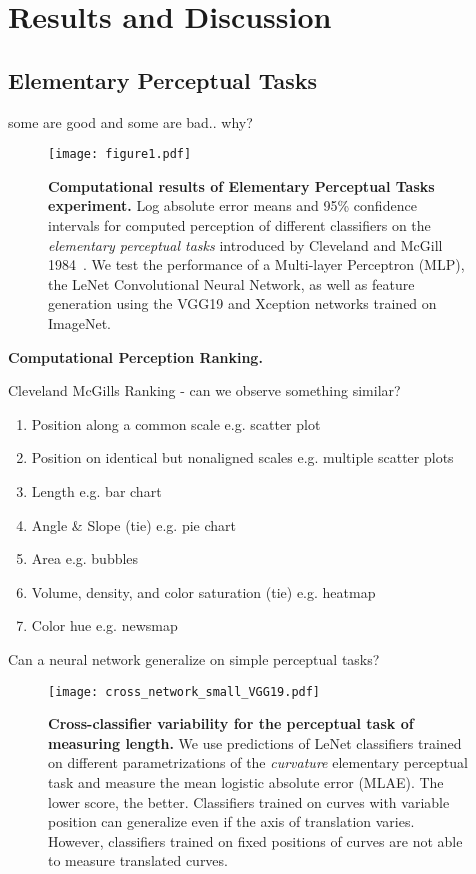 \section{Results and Discussion}

\subsection{Elementary Perceptual Tasks}

some are good and some are bad.. why?

\begin{figure*}[h]
	\centering
	  \texttt{[image: figure1.pdf]}
  \caption{\textbf{Computational results of Elementary Perceptual Tasks experiment.} Log absolute error means and 95\% confidence intervals for computed perception of different classifiers on the \emph{elementary perceptual tasks} introduced by Cleveland and McGill 1984~\cite{cleveland_mcgill}. We test the performance of a Multi-layer Perceptron (MLP), the LeNet Convolutional Neural Network, as well as feature generation using the VGG19 and Xception networks trained on ImageNet.}
	\label{fig:figure1_results}
\end{figure*}

\textbf{Computational Perception Ranking.}

Cleveland McGills Ranking - can we observe something similar?

\begin{enumerate}
	\item Position along a common scale e.g. scatter plot
	\item Position on identical but nonaligned scales e.g. multiple scatter plots
	\item Length e.g. bar chart
	\item Angle \& Slope (tie) e.g. pie chart
	\item Area e.g. bubbles
	\item Volume, density, and color saturation (tie) e.g. heatmap
	\item Color hue e.g. newsmap
\end{enumerate}


Can a neural network generalize on simple perceptual tasks?

\begin{figure}[t]
	  \texttt{[image: cross\_network\_small\_VGG19.pdf]}
  \caption{\textbf{Cross-classifier variability for the perceptual task of measuring length.} We use predictions of LeNet classifiers trained on different parametrizations of the \emph{curvature} elementary perceptual task and measure the mean logistic absolute error (MLAE). The lower score, the better. Classifiers trained on curves with variable position can generalize even if the axis of translation varies. However, classifiers trained on fixed positions of curves are not able to measure translated curves.}
	\label{fig:cross_network}
\end{figure}


